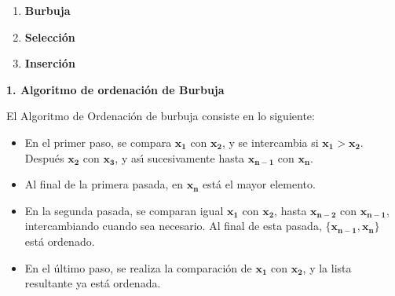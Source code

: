 \documentclass[twoside]{report}
\newcommand{\celeste}[1]{\textcolor{cyan}{#1}}
\newcommand{\bs}[1]{\boldsymbol{#1}}
\begin{document}
    \begin{enumerate}
        \item \textbf{Burbuja}
        \item \textbf{Selecci\'{o}n}
        \item \textbf{Inserci\'{o}n}
    \end{enumerate}




\textbf{1. Algoritmo de ordenaci\'{o}n de Burbuja}

 \vspace{0.5cm}
 El Algoritmo de Ordenaci\'{o}n de burbuja consiste en lo siguiente:
        \begin{itemize}
            \item En el primer paso, se compara $\bs{x_1}$ con $\bs{x_2}$, y se intercambia si $\bs{x_1>x_2}$. Despu\'{e}s $\bs{x_2}$ con $\bs{x_3}$, y as\'{\i} sucesivamente hasta $\bs{x_{n-1}}$ con $\bs{x_n}$.
            \item Al final de la primera pasada, en $\bs{x_n}$ est\'{a} el mayor elemento.
            \item En la segunda pasada, se comparan igual $\bs{x_1}$ con $\bs{x_2}$, hasta $\bs{x_{n-2}}$ con $\bs{x_{n-1}}$, intercambiando cuando sea necesario. Al final de esta pasada, $\bs{\{x_{n-1},x_n\}}$ est\'{a} ordenado.
            \item En el \'{u}ltimo paso, se realiza la comparaci\'{o}n de $\bs{x_1}$ con $\bs{x_2}$, y la lista resultante ya est\'{a} ordenada.
        \end{itemize}

\vspace*{0.5cm}
\end{document}
